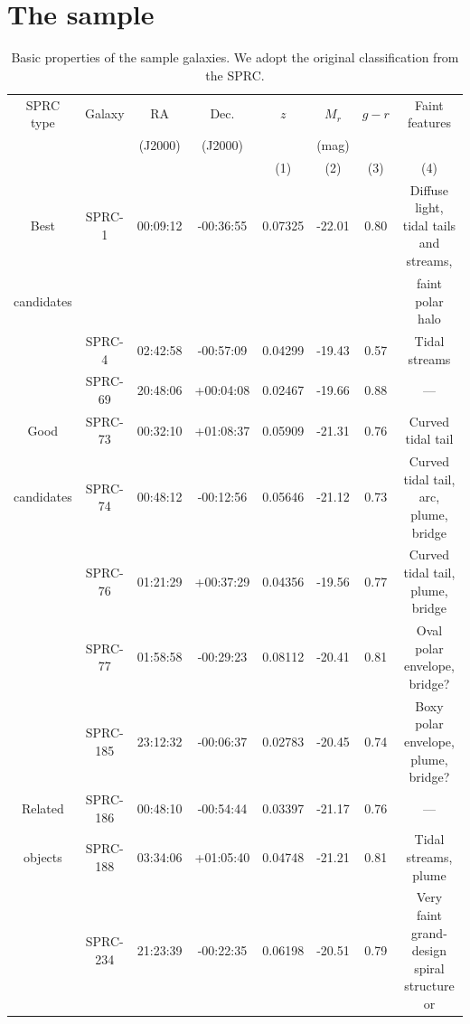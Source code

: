 \documentclass{raa}
\begin{document}
\section{The sample}
\label{sec:sample}
\begin{table}
\bc
\begin{minipage}[]{0.86\textwidth}
\caption[]{Basic properties of the sample galaxies. We adopt the original classification from the SPRC.\label{tab:Table1}}\end{minipage}
\setlength{\tabcolsep}{1pt}
\small
  \begin{tabular}{cccccccc}
  \hline\noalign{\smallskip}
SPRC type & Galaxy & RA       & Dec.    & $z$ & $M_r$ & $g - r$ & Faint features  \\ 
                &            & (J2000)& (J2000)&        & (mag)  &             &                        \\
                &            &            &            & (1)   &   (2)     &     (3)    &        (4)            \\
  \hline\noalign{\smallskip}
Best          &SPRC-1& 00:09:12&-00:36:55    &0.07325 &  -22.01 & 0.80 & Diffuse light, tidal tails and streams,    \tabularnewline
candidates &          &               &                    &              &              &         & faint polar halo   \tabularnewline
           &SPRC-4    & 02:42:58 & -00:57:09&0.04299 &  -19.43 & 0.57 & Tidal streams    \tabularnewline
           &SPRC-69  & 20:48:06&+00:04:08&0.02467 &  -19.66 & 0.88 & ---    \tabularnewline
\hline
Good       &SPRC-73  &00:32:10&+01:08:37&0.05909 & -21.31 & 0.76 & Curved tidal tail  \tabularnewline
candidates &SPRC-74 & 00:48:12&-00:12:56 &0.05646 & -21.12 & 0.73 & Curved tidal tail, arc, plume, bridge  \tabularnewline
           &SPRC-76  & 01:21:29&+00:37:29&0.04356 & -19.56 & 0.77 & Curved tidal tail, plume, bridge \tabularnewline
           &SPRC-77  & 01:58:58 & -00:29:23&0.08112 & -20.41 & 0.81 & Oval polar envelope, bridge? \tabularnewline
           &SPRC-185 &23:12:32&-00:06:37&0.02783 & -20.45 & 0.74 & Boxy polar envelope, plume, bridge? \tabularnewline
\hline
Related    &SPRC-186 & 00:48:10 & -00:54:44 & 0.03397 &-21.17 & 0.76 & ---   \tabularnewline
objects    &SPRC-188 & 03:34:06 & +01:05:40 & 0.04748 &-21.21 & 0.81 & Tidal streams, plume   \tabularnewline
           &SPRC-234 & 21:23:39 & -00:22:35 & 0.06198 &-20.51 & 0.79 & Very faint grand-design spiral structure or\tabularnewline

\end{tabular}
\end{table}
\end{document}
